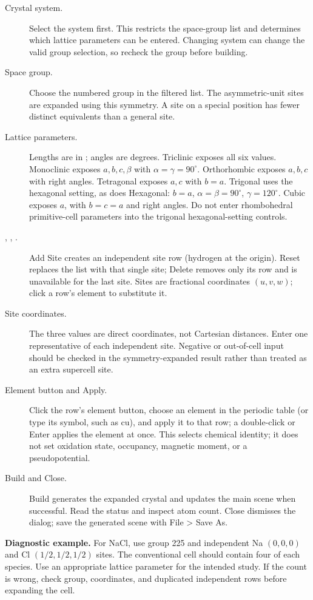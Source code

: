 \begin{description}
\item[Crystal system.] Select the system first. This restricts the space-group list and determines which lattice parameters can be entered. Changing system can change the valid group selection, so recheck the group before building.
\item[Space group.] Choose the numbered group in the filtered list. The asymmetric-unit sites are expanded using this symmetry. A site on a special position has fewer distinct equivalents than a general site.
\item[Lattice parameters.] Lengths are in \angstrom; angles are degrees. Triclinic exposes all six values. Monoclinic exposes $a,b,c,\beta$ with $\alpha=\gamma=90^\circ$. Orthorhombic exposes $a,b,c$ with right angles. Tetragonal exposes $a,c$ with $b=a$. Trigonal uses the hexagonal setting, as does Hexagonal: $b=a$, $\alpha=\beta=90^\circ$, $\gamma=120^\circ$. Cubic exposes $a$, with $b=c=a$ and right angles. Do not enter rhombohedral primitive-cell parameters into the trigonal hexagonal-setting controls.
\item[\normalfont{}, , .] Add Site creates an independent site row (hydrogen at the origin). Reset replaces the list with that single site; Delete removes only its row and is unavailable for the last site. Sites are fractional coordinates $(u, v, w)$; click a row's element to substitute it.
\item[Site coordinates.] The three values are direct coordinates, not Cartesian distances. Enter one representative of each independent site. Negative or out-of-cell input should be checked in the symmetry-expanded result rather than treated as an extra supercell site.
\item[Element button and Apply.] Click the row's element button, choose an element in the periodic table (or type its symbol, such as cu), and apply it to that row; a double-click or Enter applies the element at once. This selects chemical identity; it does not set oxidation state, occupancy, magnetic moment, or a pseudopotential.
\item[Build and Close.] Build generates the expanded crystal and updates the main scene when successful. Read the status and inspect atom count. Close dismisses the dialog; save the generated scene with File > Save As.
\end{description}
\textbf{Diagnostic example.} For NaCl, use group 225 and independent Na $(0,0,0)$ and Cl $(1/2,1/2,1/2)$ sites. The conventional cell should contain four of each species. Use an appropriate lattice parameter for the intended study. If the count is wrong, check group, coordinates, and duplicated independent rows before expanding the cell.

